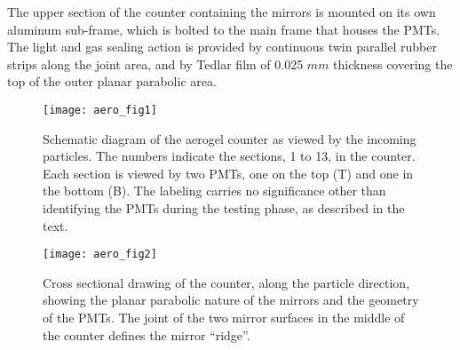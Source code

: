 {The upper section of the counter containing the mirrors is mounted on its
own aluminum sub-frame, which is bolted to the main frame that houses the PMTs. 
The light and gas sealing action is provided by continuous twin parallel rubber
strips along the joint area, and by Tedlar film of 0.025 $mm$ thickness
covering the top of the outer planar parabolic area. 
%
\begin{figure}[htb]
\begin{center}
  \texttt{[image: aero\_fig1]}
\end{center}
\caption[Aerogel:layout]{
 Schematic diagram of the aerogel \Cherenkov{} counter as viewed by the
 incoming particles.  The numbers indicate the sections, 1 to 13, in the
 counter. Each section is viewed by two PMTs, one on the top (T) and one in the
 bottom (B). The labeling carries no significance other than identifying the
 PMTs during the testing phase, as described in the text.
 }
\label{fig:aero_fig1}
\end{figure}

} %
\begin{figure}[htb]
\begin{center}
  \texttt{[image: aero\_fig2]}
\end{center}
\caption[Aerogel:mirrors]{
 Cross sectional drawing of the counter, along the particle direction, 
 showing the planar parabolic nature of the mirrors and the geometry of the 
 PMTs.  The joint of the two mirror surfaces in
 the middle of the counter defines the mirror ``ridge''.
 }
\label{fig:aero_fig2}
\end{figure}

